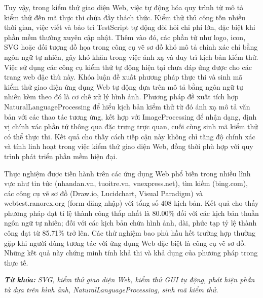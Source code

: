 \documentclass[a4paper, 12pt]{report}
\begin{document}
Tuy vậy, trong kiểm thử giao diện Web, việc tự động hóa quy trình từ mô tả kiểm thử đến mã thực thi chứa đầy thách thức. Kiểm thử thủ công tốn nhiều thời gian, việc viết và bảo trì \gls{TestScript} tự động đòi hỏi chi phí lớn, đặc biệt khi phần mềm thường xuyên cập nhật. Thêm vào đó, các phần tử như logo, icon, SVG hoặc đối tượng đồ họa trong công cụ vẽ sơ đồ khó mô tả chính xác chỉ bằng ngôn ngữ tự nhiên, gây khó khăn trong việc ánh xạ và duy trì kịch bản kiểm thử. Việc sử dụng các công cụ kiểm thử tự động hiện tại chưa đáp ứng được cho các trang web đặc thù này. Khóa luận đề xuất phương pháp thực thi và sinh mã kiểm thử giao diện ứng dụng Web tự động dựa trên mô tả bằng ngôn ngữ tự nhiên kèm theo đó là cơ chế xử lý hình ảnh. 
 Phương pháp đề xuất tích hợp \gls{NaturalLanguageProcessing} để hiểu kịch bản kiểm thử từ đó ánh xạ mô tả văn bản với các thao tác tương ứng, kết hợp với \gls{ImageProcessing} để nhận dạng, định vị chính xác phần tử thông qua đặc trưng trực quan, cuối cùng sinh mã kiểm thử có thể thực thi. Kết quả cho thấy cách tiếp cận này không chỉ tăng độ chính xác và tính linh hoạt trong việc kiểm thử giao diện Web, đồng thời phù hợp với quy trình phát triển phần mềm hiện đại.


Thực nghiệm được tiến hành trên các ứng dụng Web phổ biến trong nhiều lĩnh vực như tin tức (nhandan.vn, tuoitre.vn, vnexpress.net), tìm kiếm (bing.com), các công cụ vẽ sơ đồ (Draw.io, Lucidchart, Visual Paradigm) và webtest.ranorex.org (form đăng nhập) với tổng số 408 kịch bản. Kết quả cho thấy phương pháp đạt tỉ lệ thành công thấp nhất là 80.00\% đối với các kịch bản thuần ngôn ngữ tự nhiên; đối với các kịch bản chứa hình ảnh, dài, phức tạp tỷ lệ thành công đạt từ 85.71\% trở lên. Các thử nghiệm bao phủ hầu hết trường hợp thường gặp khi người dùng tương tác với ứng dụng Web đặc biệt là công cụ vẽ sơ đồ. Những kết quả này chứng minh tính khả thi và khả dụng của phương pháp trong thực tế.



 \textit{\textbf{Từ khóa:}} \textit{SVG, kiểm thử giao diện Web, kiểm thử GUI tự động, phát hiện phần tử dựa trên hình ảnh, \gls{NaturalLanguageProcessing}, sinh mã kiểm thử.}
\end{document}
